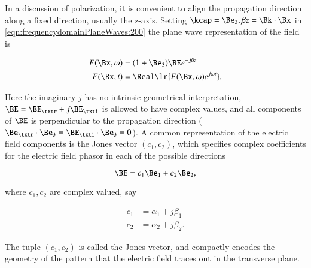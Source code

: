 %
%
In a discussion of polarization, it is convenient to align the propagation direction along a fixed direction, usually the z-axis.
Setting \( \kcap = \Be_3, \beta z = \Bk \cdot \Bx \) in \cref{eqn:frequencydomainPlaneWaves:200} the plane wave representation of the field is

\begin{dmath}\label{eqn:polarization:20}
\begin{aligned}
F(\Bx, \omega) &= (1 + \Be_3) \BE e^{-j \beta z} \\
F(\Bx, t) &= \Real\lr{ F(\Bx, \omega) e^{j \omega t} }.
\end{aligned}
\end{dmath}

Here the imaginary \( j \) has no intrinsic geometrical interpretation, \( \BE = \BE_\txtr + j \BE_\txti \) is allowed to have complex values, and all components of \( \BE \) is perpendicular to the propagation direction (\( \Be_\txtr \cdot \Be_3 = \BE_\txti \cdot \Be_3 = 0 \)).
A common representation of the electric field components is the Jones vector \( (c_1, c_2) \), which specifies complex coefficients for the electric field phasor in each of the possible directions

\begin{dmath}\label{eqn:polarization:120}
\BE = c_1 \Be_1 + c_2 \Be_2,
\end{dmath}

where \( c_1, c_2 \) are complex valued, say

\begin{dmath}\label{eqn:polarization:140}
\begin{aligned}
c_1 &= \alpha_1 + j \beta_1 \\
c_2 &= \alpha_2 + j \beta_2.
\end{aligned}
\end{dmath}

The tuple \( (c_1, c_2) \) is called the Jones vector, and compactly encodes the geometry of the pattern that the electric field traces out in the transverse plane.

